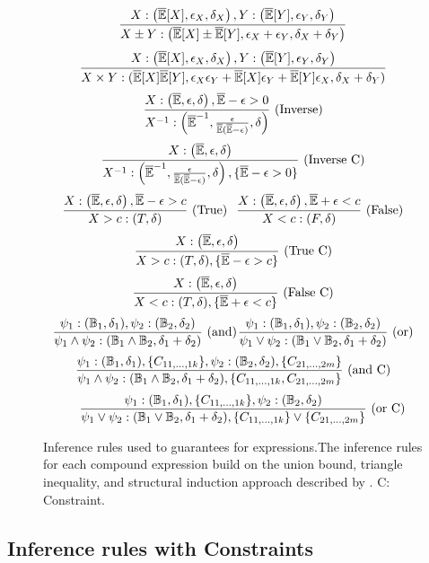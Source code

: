 \begin{subappendices}
\begin{figure}
\[
\dfrac{X: \left(\overline{\mathbb{E}}[X], \epsilon_X, \delta_X\right), Y: \left(\overline{\mathbb{E}}[Y], \epsilon_Y, \delta_Y\right)}{X \pm Y: \left(\overline{\mathbb{E}}[X] \pm \overline{\mathbb{E}}[Y], \epsilon_X + \epsilon_Y, \delta_X + \delta_Y\right)}
\]
\[
\dfrac{X: \left(\overline{\mathbb{E}}[X], \epsilon_X, \delta_X\right), Y: \left(\overline{\mathbb{E}}[Y], \epsilon_Y, \delta_Y\right)}{ X \times Y: (\overline{\mathbb{E}}[X] \overline{\mathbb{E}}[Y], \epsilon_X \epsilon_Y + \overline{\mathbb{E}}[X] \epsilon_Y + \overline{\mathbb{E}}[Y] \epsilon_X, \delta_X + \delta_Y)} 
\]
\[
\dfrac{X: \left(\overline{\mathbb{E}}, \epsilon, \delta \right), \overline{\mathbb{E}} - \epsilon > 0}{ X^{-1}: \left(\overline{\mathbb{E}}^{-1}, \frac{\epsilon}{\overline{\mathbb{E}} (\overline{\mathbb{E}} - \epsilon)}  , \delta \right)}\text{ (Inverse)} 
\] 
\[
\dfrac{X: \left(\overline{\mathbb{E}}, \epsilon, \delta \right)}{ X^{-1}: \left(\overline{\mathbb{E}}^{-1}, \frac{\epsilon}{\overline{\mathbb{E}} (\overline{\mathbb{E}} - \epsilon)}  , \delta \right), \{ \overline{\mathbb{E}} - \epsilon > 0\}} \text{ (Inverse C)}
\]
\[
\dfrac{X: \left(\overline{\mathbb{E}}, \epsilon, \delta\right), \overline{\mathbb{E}} - \epsilon > c}{ X > c: (T, \delta)} \text{ (True)} \hspace{0.1in} \dfrac{X: \left(\overline{\mathbb{E}}, \epsilon, \delta \right), \overline{\mathbb{E}}  + \epsilon < c}{ X < c: (F, \delta)} \text{ (False)} 
\] 
\[
\dfrac{X: \left(\overline{\mathbb{E}}, \epsilon, \delta\right)}{ X > c: (T, \delta), \{\overline{\mathbb{E}} - \epsilon > c\}} \text{ (True C)} \]
\[
\dfrac{X: \left(\overline{\mathbb{E}}, \epsilon, \delta \right)}{ X < c: (T, \delta), \{\overline{\mathbb{E}} + \epsilon < c\}} \text{ (False C)} 
\] 
\[
\dfrac{\psi_1: (\mathbb{B}_1, \delta_1), \psi_2: (\mathbb{B}_2, \delta_2)}{\psi_1 \wedge \psi_2: (\mathbb{B}_1 \wedge \mathbb{B}_2, \delta_1 + \delta_2)} \text{ (and)} \hspace{0.01in} \dfrac{\psi_1: (\mathbb{B}_1, \delta_1), \psi_2: (\mathbb{B}_2, \delta_2)}{\psi_1 \vee \psi_2: (\mathbb{B}_1 \vee \mathbb{B}_2, \delta_1 + \delta_2)} \text{ (or)}
\]
\[
\dfrac{\psi_1: (\mathbb{B}_1, \delta_1), \{C_{11, \dots, 1k}\}, \psi_2: (\mathbb{B}_2, \delta_2), \{C_{21, \dots, 2m}\}}{\psi_1 \wedge \psi_2: (\mathbb{B}_1 \wedge \mathbb{B}_2, \delta_1 + \delta_2), \{C_{11, \dots, 1k}, C_{21, \dots, 2m}\}} \text{ (and C)} \]
\[
\hspace{0.2in} \dfrac{\psi_1: (\mathbb{B}_1, \delta_1), \{C_{11, \dots, 1k}\}, \psi_2: (\mathbb{B}_2, \delta_2)}{\psi_1 \vee \psi_2: (\mathbb{B}_1 \vee \mathbb{B}_2, \delta_1 + \delta_2),  \{C_{11, \dots, 1k}\} \vee \{C_{21, \dots, 2m}\}} \text{ (or C)}
\]%
\caption{Inference rules used to guarantees for expressions.The inference rules for each compound expression build on the union bound, triangle inequality, and structural induction approach described by \cite{bastani2019probabilistic}. C: Constraint.}
\label{fig:inference}
\end{figure}
\subsection{Inference rules with Constraints}
\label{sec:appendix:constraint:proofs}


\end{subappendices}
